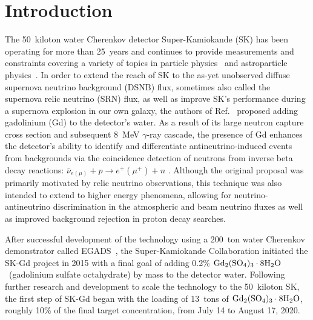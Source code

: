 \documentclass[preprint,12pt]{elsarticle}
\newcommand{\GdSOw}{$\rm Gd_2(\rm SO_4)_3\cdot \rm 8H_2O$\ }
\begin{document}
\section{Introduction} %
\label{S:1}
The 50~kiloton water Cherenkov detector Super-Kamiokande (SK) has been operating for more than 25~years and continues to provide measurements and constraints covering a variety of topics in particle physics~\cite{pdacay:2020,nature:2020} and astroparticle physics~\cite{wimp:2020}. 
In order to extend the reach of SK to the as-yet unobserved diffuse supernova neutrino background (DSNB) flux, sometimes also called the supernova relic neutrino (SRN) flux, as well as improve SK's performance during a supernova explosion in our own galaxy, the authors of Ref.~\cite{beacom:2004} proposed adding gadolinium (Gd) to the detector's water.
As a result of its large neutron capture cross section and subsequent 8~MeV $\gamma$-ray cascade, the presence of Gd enhances the detector's ability to identify and differentiate antineutrino-induced events from backgrounds via the coincidence detection of neutrons from inverse beta decay reactions: $\bar{\nu}_{e(\mu)} + p \rightarrow e^+(\mu^+) + n$ . 
Although the original proposal was primarily motivated by relic neutrino observations, this technique was also intended to extend to higher energy phenomena, allowing for neutrino-antineutrino discrimination in the atmospheric and beam neutrino fluxes as well as improved background rejection in proton decay searches.

After successful development of the technology using a 200~ton water Cherenkov demonstrator called EGADS~\cite{egads:2020}, the Super-Kamiokande Collaboration initiated the SK-Gd project in 2015 with a final goal of adding 0.2\% \GdSOw (gadolinium sulfate octahydrate) by mass to the detector water.
Following further research and development to scale the technology to the 50~kiloton SK, the first step of SK-Gd began with the loading of 13~tons of $\rm Gd_2(\rm SO_4)_3\cdot \rm 8H_2O$, roughly 10\% of the final target concentration,  from July 14 to August 17, 2020.
\end{document}
